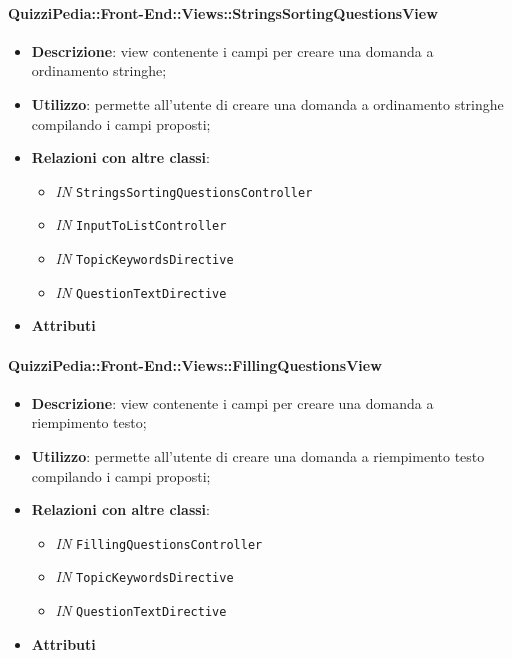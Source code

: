 \paragraph{QuizziPedia::Front-End::Views::StringsSortingQuestionsView}
\begin{itemize}
	\item \textbf{Descrizione}: view contenente i campi per creare una domanda a ordinamento stringhe;
	\item \textbf{Utilizzo}: permette all'utente di creare una domanda a ordinamento stringhe compilando i campi proposti;
	\item \textbf{Relazioni con altre classi}:
		\begin{itemize}
			\item \textit{IN} \texttt{StringsSortingQuestionsController} \\
			\item \textit{IN} \texttt{InputToListController} \\
			\item \textit{IN} \texttt{TopicKeywordsDirective} \\
			\item \textit{IN} \texttt{QuestionTextDirective} \\ 
		\end{itemize}
	\item \textbf{Attributi}
\end{itemize}

\paragraph{QuizziPedia::Front-End::Views::FillingQuestionsView}
\begin{itemize}
	\item \textbf{Descrizione}: view contenente i campi per creare una domanda a riempimento testo;
	\item \textbf{Utilizzo}:  permette all'utente di creare una domanda a riempimento testo compilando i campi proposti;
	\item \textbf{Relazioni con altre classi}:
	\begin{itemize}
		\item \textit{IN} \texttt{FillingQuestionsController} \\
		\item \textit{IN} \texttt{TopicKeywordsDirective} \\
		\item \textit{IN} \texttt{QuestionTextDirective} \\ 
	\end{itemize}
	\item \textbf{Attributi}
\end{itemize}

